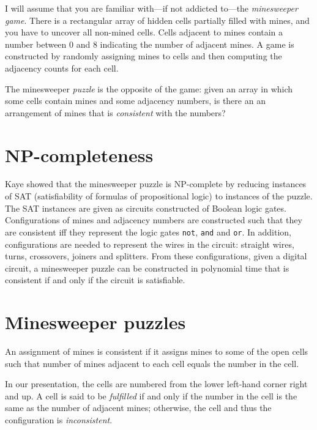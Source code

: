 \documentclass[11pt,a4paper]{article}
\begin{document}
I will assume that you are familiar with---if not addicted to---the \emph{minesweeper game}. There is a rectangular array of hidden cells partially filled with mines, and you have to uncover all non-mined cells. Cells adjacent to mines contain a number between 0 and 8 indicating the number of adjacent mines. A game is constructed by randomly assigning mines to cells and then computing the adjacency counts for each cell. 

The minesweeper \emph{puzzle} is the opposite of the game: given an array in which some cells contain mines and some adjacency numbers, is there an an arrangement of mines that is \emph{consistent} with the numbers?

\section{NP-completeness}

Kaye showed that the minesweeper puzzle is NP-complete by reducing instances of SAT (satisfiability of formulas of propositional logic) to instances of the puzzle. The SAT instances are given as circuits constructed of Boolean logic gates. Configurations of mines and adjacency numbers are constructed such that they are consistent iff they represent the logic gates \texttt{not}, \texttt{and} and \texttt{or}. In addition, configurations are needed to represent the wires in the circuit: straight wires, turns, crossovers, joiners and splitters. From these configurations, given a digital circuit, a minesweeper puzzle can be constructed in polynomial time that is consistent if and only if the circuit is satisfiable.


\section{Minesweeper puzzles}

An assignment of mines is consistent if it assigns mines to some of the open cells such that number of mines adjacent to each cell equals the number in the cell.

In our presentation, the cells are numbered from the lower left-hand corner right and up. A cell is said to be \emph{fulfilled} if and only if the number in the cell is the same as the number of adjacent mines; otherwise, the cell and thus the configuration is \emph{inconsistent}.
\end{document}
